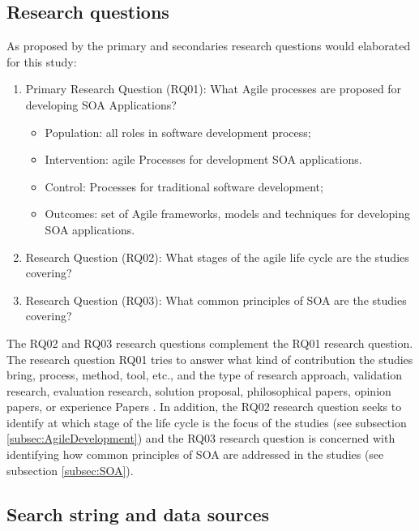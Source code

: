 \subsection{Research questions}
\label{subsec:ResearchQuestion}
As proposed by \cite{Kitchenham2007} the primary and secondaries research questions would elaborated for this study:
\begin{enumerate}
\item Primary Research Question (RQ01): What Agile processes are proposed for developing SOA Applications?
	\begin{itemize}
	\item Population: all roles in software development process;
    \item Intervention: agile Processes for development SOA applications.
    \item Control: Processes for traditional software development;
    \item Outcomes: set of Agile frameworks, models and techniques for developing SOA applications.
	\end{itemize}
\item Research Question (RQ02): What stages of the agile life cycle are the studies covering?
\item Research Question (RQ03): What common principles of \acrfull{SOA} are the studies covering?
\end{enumerate}

The RQ02 and RQ03 research questions complement the RQ01 research question. The research question RQ01 tries to answer what kind of contribution the studies bring, process, method, tool, etc., and the type of research approach, validation research, evaluation research, solution proposal, philosophical papers, opinion papers, or experience Papers \cite{wieringa2006requirements}. In addition, the RQ02 research question seeks to identify at which stage of the life cycle is the focus of the studies (see subsection \ref{subsec:AgileDevelopment}) and the RQ03 research question is concerned with identifying how common principles of \acrshort{SOA} are addressed in the studies (see subsection \ref{subsec:SOA}).



\subsection{Search string and data sources}
\label{subsec:SearchStringDataSources}

